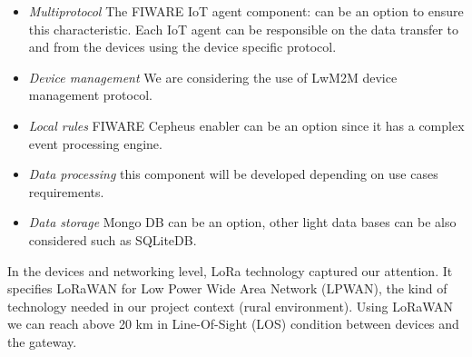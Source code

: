 \begin{itemize}
    \item \emph{Multiprotocol}
The FIWARE IoT agent component: can be an option to ensure this characteristic. 
Each IoT agent can be responsible on the data transfer to and from the devices using the device specific protocol. 
    \item \emph{Device management}
We are considering the use of LwM2M device management protocol.
    \item \emph{Local rules}
FIWARE Cepheus enabler can be an option since it has a complex event processing engine. 
    \item \emph{Data processing}
this component will be developed depending on use cases requirements.
    \item \emph{Data storage}
Mongo DB can be an option, other light data bases can be also considered such as SQLiteDB.
\end{itemize}

In the devices and networking level, LoRa technology captured our attention. 
It specifies LoRaWAN for Low Power Wide Area Network (LPWAN), the kind of technology needed in our project context (rural environment). 
Using LoRaWAN we can reach above 20 km in Line-Of-Sight (LOS) condition between devices and the gateway. 

